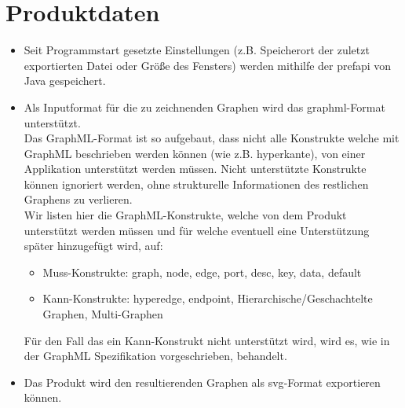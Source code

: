 \chapter{Produktdaten}\label{ch:daten}

\begin{itemize}
  \item Seit Programmstart gesetzte Einstellungen (z.B. Speicherort der zuletzt exportierten Datei oder Größe des Fensters) werden mithilfe der \gls{prefapi} von Java gespeichert.
  \item Als Inputformat für die zu zeichnenden Graphen wird das \gls{graphml}-Format unterstützt.\\
    Das GraphML-Format ist so aufgebaut, dass nicht alle Konstrukte welche mit GraphML beschrieben werden können (wie z.B. \gls{hyperkante}),
    von einer Applikation unterstützt werden müssen.
    Nicht unterstützte Konstrukte können ignoriert werden, ohne strukturelle Informationen des restlichen Graphens zu verlieren.\\
    Wir listen hier die GraphML-Konstrukte, welche von dem Produkt unterstützt werden müssen und für welche eventuell eine Unterstützung später hinzugefügt wird, auf:
    \begin{itemize}
      \item Muss-Konstrukte: graph, node, edge, port, desc, key, data, default %
      \item Kann-Konstrukte: hyperedge, endpoint, Hierarchische/Geschachtelte Graphen,  Multi-Graphen
    \end{itemize}
    Für den Fall das ein Kann-Konstrukt nicht unterstützt wird, wird es, wie in der GraphML Spezifikation vorgeschrieben, behandelt.
  \item Das Produkt wird den resultierenden Graphen als \gls{svg}-Format exportieren können.
\end{itemize}

